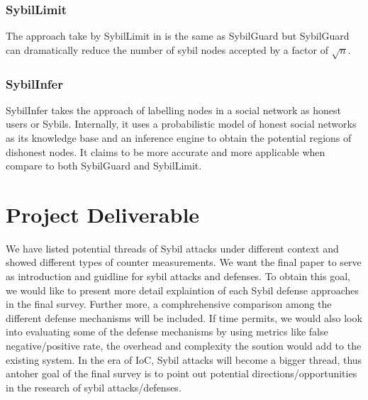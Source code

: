 \documentclass[conference]{IEEEtran}
\begin{document}
\subsubsection{SybilLimit}
The approach take by SybilLimit in \cite{Yu08SybilLimit} is the same as SybilGuard but SybilGuard can dramatically reduce the number of sybil nodes accepted by a factor of  $ \sqrt{n} $.

\subsubsection{SybilInfer}
SybilInfer takes the approach of labelling nodes in a social network as honest users or Sybils. Internally, it uses a probabilistic model of honest social networks as its knowledge base and an inference engine to obtain the potential regions of dishonest nodes.
It claims to be more accurate and more applicable when compare to both SybilGuard and SybilLimit.


\section{Project Deliverable}
We have listed potential threads of Sybil attacks under different context and showed different types of counter measurements. 
We want the final paper to serve as introduction and guidline for sybil attacks and defenses.
To obtain this goal, we would like to present more detail explaintion of each Sybil defense approaches in the final survey. Further more, a comphrehensive comparison among the different defense mechanisms will be included.
If time permits, we would also look into evaluating some of the defense mechanisms by using metrics like false negative/positive rate, the overhead and complexity the soution would add to the existing system.
In the era of IoC, Sybil attacks will become a bigger thread, thus antoher goal of the final survey is to point out potential directions/opportunities in the research of sybil attacks/defenses. 

%
%
\end{document}
